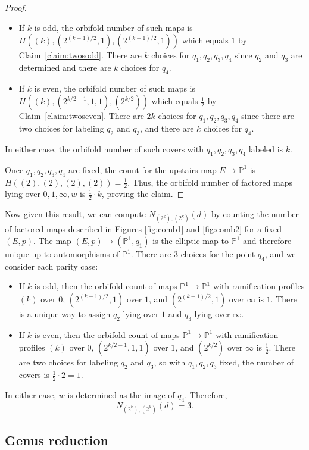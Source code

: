 \documentclass[thesis]{thesis-umich}           %
\renewcommand{\P}{\mathbb P}
\theoremstyle{definition}
\begin{document}
\begin{proof}
  \begin{itemize}
  \item If $k$ is odd, the orbifold number of such maps is $H((k),(2^{(k-1)/2},1),(2^{(k-1)/2},1))$ which
    equals $1$ by Claim~\ref{claim:twosodd}. There are $k$ choices for $q_1,q_2,q_3,q_4$
    since $q_2$ and $q_3$ are determined and there are $k$ choices for $q_4$.
  \item If $k$ is even, the orbifold number of such maps is $H((k),(2^{k/2-1},1,1),(2^{k/2}))$ which equals $\frac 12$ by Claim~\ref{claim:twoseven}. There are $2k$ choices for $q_1,q_2,q_3,q_4$
    since there are two choices for labeling $q_2$ and $q_3$, and there are $k$ choices for
    $q_4$.
  \end{itemize}
  In either case, the orbifold number of such covers with $q_1,q_2,q_3,q_4$ labeled is $k$.

  Once $q_1,q_2,q_3,q_4$ are fixed, the count for the upstairs map $E\to\P^1$ is
  $H((2),(2),(2),(2))=\frac 12$. Thus, the orbifold number of factored maps lying over $0,1,\infty,w$ is $\frac 12\cdot k$, proving the claim.
  
\end{proof}

Now given this result, we can compute $N_{(2^k),(2^k)}(d)$ by counting
the number of factored maps described in Figures \ref{fig:comb1} and \ref{fig:comb2} for a fixed $(E,p)$.
The map $(E,p)\to(\P^1,q_1)$ is the elliptic map to $\P^1$ and therefore unique up
to automorphisms of $\P^1$.
There are $3$ choices for the point
$q_4$, and we consider each parity case:
\begin{itemize}
\item If $k$ is odd, then the orbifold count of maps
  $\P^1\to\P^1$ with ramification profiles $(k)$ over $0$,
  $(2^{(k-1)/2},1)$ over $1$, and $(2^{(k-1)/2},1)$ over $\infty$
  is $1$. There is a unique way to assign $q_2$ lying over $1$
  and $q_3$ lying over $\infty$.
  \item
  If $k$ is even, then the orbifold count of maps $\P^1\to\P^1$ with
  ramification profiles $(k)$ over $0$, $(2^{k/2-1},1,1)$ over $1$, and
  $(2^{k/2})$ over $\infty$ is $\frac 12$. There are two choices for
  labeling $q_2$ and $q_3$, so with $q_1,q_2,q_3$ fixed, the number
  of covers is $\frac 12\cdot 2=1$.
\end{itemize}
In either case, $w$ is determined as the image of $q_4$.
Therefore,
\[
N_{(2^k),(2^k)}(d)=3.
\]

\subsection{Genus reduction}
\end{document}
